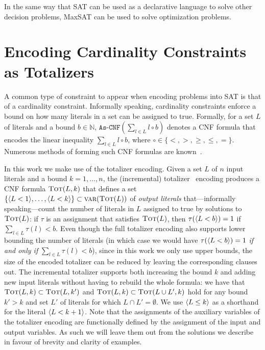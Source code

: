 In the same way that SAT can be used as a declarative language to solve other decision problems, MaxSAT can be used to solve optimization problems.

\begin{example}\label{ex:maxsat-modelling}
\end{example}

\section{Encoding Cardinality Constraints as Totalizers\label{sec:card-const}}


A common type of constraint to appear when encoding problems into SAT is that of a cardinality constraint.
Informally speaking, cardinality constraints enforce a bound on how many literals in a set can be assigned to true.
Formally, for a set $L$ of literals and a bound $b \in \mathbb{N}$, $\texttt{As-CNF}\left(\sum_{l \in L} l \circ b\right)$ denotes a CNF formula that encodes the linear inequality $\sum_{l \in L} l \circ b$, where $\circ \in \{< ,> ,\geq, \leq, =\}$.
Numerous methods of forming such CNF formulas are known~\autocite{DBLP:conf/cp/BailleuxB03}.

In this work we make use of the totalizer encoding.
Given a set $L$ of $n$ input literals and a bound $k=1, \ldots, n$, the (incremental) totalizer~\autocite{DBLP:conf/cp/BailleuxB03,DBLP:conf/cp/MartinsJML14} encoding produces a CNF formula $\textsc{Tot}(L, k)$ that defines a set $\{\langle L < 1 \rangle, \ldots, \langle L < k \rangle\} \subset \textsc{var}(\textsc{Tot}(L))$ of \emph{output literals} that---informally speaking---count the number of literals in $L$ assigned to true by solutions to $\textsc{Tot}(L)$:
if $\tau$ is an assignment that satisfies $\textsc{Tot}(L)$, then $\tau(\langle L < b \rangle) = 1$ if $\sum_{l \in L} \tau(l) < b$.
Even though the full totalizer encoding also supports lower bounding the number of literals (in which case we would have $\tau(\langle L < b \rangle)=1$ \emph{if and only if} $\sum_{l \in L} \tau(l) < b$), since in this work we only use upper bounds, the size of the encoded totalizer can be reduced by leaving the corresponding clauses out.
The incremental totalizer supports both increasing the bound $k$ and adding new input literals without having to rebuild the whole formula:
we have that $\textsc{Tot}(L, k) \subset \textsc{Tot}(L, k')$ and $\textsc{Tot}(L, k) \subset  \textsc{Tot}(L \cup L', k)$ hold for any bound $k' > k$ and set $L'$ of literals for which $L \cap L' =  \emptyset$. 
We use $\langle L \leq k \rangle$ as a shorthand for the literal $\langle L < k+1 \rangle$.
Note that the assignments of the auxiliary variables of the totalizer encoding are functionally defined by the assignment of the input and output variables.
As such we will leave them out from the solutions we describe in favour of brevity and clarity of examples. 